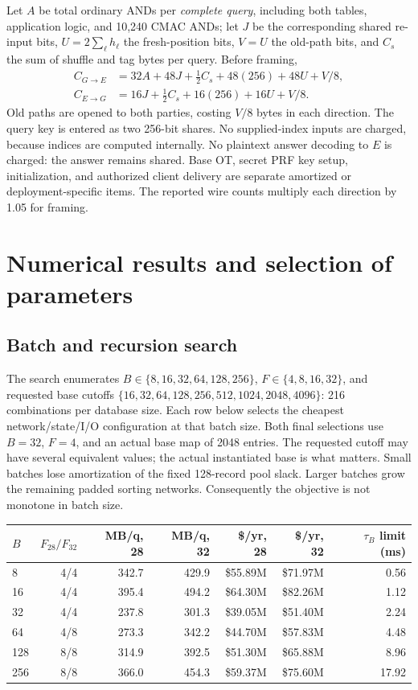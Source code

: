 \documentclass[11pt]{article}
\begin{document}
Let $A$ be total ordinary ANDs per \emph{complete query}, including both
tables, application logic, and 10,240 CMAC ANDs; let $J$ be the corresponding
shared re-input bits, $U=2\sum_\ell h_\ell$ the fresh-position bits, $V=U$
the old-path bits, and $C_s$ the sum of shuffle and tag bytes per query.
Before framing,
\begin{align}
 C_{G\to E}&=32A+48J+\tfrac12C_s+48(256)+48U+V/8,\\
 C_{E\to G}&=16J+\tfrac12C_s+16(256)+16U+V/8.
\label{eq:wire}
\end{align}
Old paths are opened to both parties, costing $V/8$ bytes in each direction.
The query key is entered as two 256-bit shares. No supplied-index inputs are
charged, because indices are computed internally. No plaintext answer
decoding to $E$ is charged: the answer remains shared. Base OT, secret PRF
key setup, initialization, and authorized client delivery are separate
amortized or deployment-specific items. The reported wire counts multiply
each direction by 1.05 for framing.

\section{Numerical results and selection of parameters}
\label{sec:results}
\subsection{Batch and recursion search}
The search enumerates $B\in\{8,16,32,64,128,256\}$,
$F\in\{4,8,16,32\}$, and requested base cutoffs
$\{16,32,64,128,256,512,1024,2048,4096\}$: 216 combinations per database
size. Each row below selects the cheapest network/state/I/O configuration
at that batch size. Both final selections use $B=32$, $F=4$, and an actual
base map of 2048 entries. The requested cutoff may have several equivalent
values; the actual instantiated base is what matters. Small batches lose
amortization of the fixed 128-record pool slack. Larger batches grow the
remaining padded sorting networks. Consequently the objective is not
monotone in batch size.

\begin{center}\small
\begin{tabular}{lrrrrrr}\toprule
$B$ & $F_{28}/F_{32}$ & MB/q, 28 & MB/q, 32 & \$/yr, 28 & \$/yr, 32 & $\tau_B$ limit (ms)\\\midrule
8 & 4/4 & 342.7 & 429.9 & \$55.89M & \$71.97M & 0.56\\
16 & 4/4 & 395.4 & 494.2 & \$64.30M & \$82.26M & 1.12\\
32 & 4/4 & 237.8 & 301.3 & \$39.05M & \$51.40M & 2.24\\
64 & 4/8 & 273.3 & 342.2 & \$44.70M & \$57.83M & 4.48\\
128 & 8/8 & 314.9 & 392.5 & \$51.30M & \$65.88M & 8.96\\
256 & 8/8 & 366.0 & 454.3 & \$59.37M & \$75.60M & 17.92\\
\bottomrule\end{tabular}
\end{center}
\end{document}
